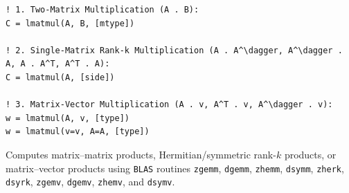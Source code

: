 
\lstset{language=[95]Fortran}
\begin{lstlisting}
! 1. Two-Matrix Multiplication (A . B):
C = lmatmul(A, B, [mtype])

! 2. Single-Matrix Rank-k Multiplication (A . A^\dagger, A^\dagger . A, A . A^T, A^T . A):
C = lmatmul(A, [side])

! 3. Matrix-Vector Multiplication (A . v, A^T . v, A^\dagger . v):
w = lmatmul(A, v, [type])
w = lmatmul(v=v, A=A, [type])
\end{lstlisting}

Computes matrix--matrix products, Hermitian/symmetric rank-$k$ products, or matrix--vector products using \texttt{BLAS} routines \texttt{zgemm}, \texttt{dgemm}, \texttt{zhemm}, \texttt{dsymm}, \texttt{zherk}, \texttt{dsyrk}, \texttt{zgemv}, \texttt{dgemv}, \texttt{zhemv}, and \texttt{dsymv}.

